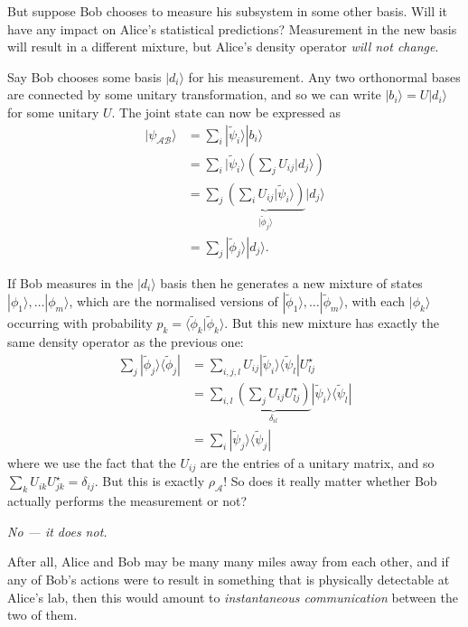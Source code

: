 \documentclass[fleqn]{article}
\renewcommand{\footnote}[1]{\en{#1}}
\begin{document}
But suppose Bob chooses to measure his subsystem in some other basis.
Will it have any impact on Alice's statistical predictions?
Measurement in the new basis will result in a different mixture, but Alice's density operator \emph{will not change}.

Say Bob chooses some basis \(|d_i\rangle\) for his measurement.
Any two orthonormal bases are connected by some unitary transformation, and so we can write \(|b_i\rangle=U|d_i\rangle\) for some\footnote{In terms of components, \(|b_i\rangle=\sum_j U_{ij}|d_j\rangle\)} unitary \(U\).
The joint state can now be expressed as
\[
  \begin{aligned}
    |\psi_{\mathcal{AB}}\rangle
    &= \sum_{i} |\widetilde\psi_i\rangle|b_i\rangle
  \\&= \sum_{i} |\widetilde\psi_i\rangle \left( \sum_j U_{ij}|d_j\rangle \right)
  \\&= \sum_j \underbrace{\left( \sum_i U_{ij}|\widetilde\psi_i\rangle \right)}_{|\widetilde\phi_j\rangle}|d_j\rangle
  \\&= \sum_j|\widetilde\phi_j\rangle|d_j\rangle.
  \end{aligned}
\]

If Bob measures in the \(|d_i\rangle\) basis then he generates a new mixture of states \(|\phi_1\rangle,\ldots|\phi_m\rangle\), which are the normalised versions of \(|\widetilde\phi_1\rangle,\ldots|\widetilde\phi_m\rangle\), with each \(|\phi_k\rangle\) occurring with probability \(p_k=\langle\widetilde\phi_k|\widetilde\phi_k\rangle\).
But this new mixture has exactly the same density operator as the previous one:
\[
  \begin{aligned}
    \sum_j|\widetilde\phi_j\rangle\langle\widetilde\phi_j|
    &= \sum_{i,j,l} U_{ij}|\widetilde\psi_i\rangle\langle\widetilde\psi_l|U^\star_{lj}
  \\&= \sum_{i,l} \underbrace{\left(\sum_j U_{ij}U^\star_{lj}\right)}_{\delta_{il}}|\widetilde\psi_i\rangle\langle\widetilde\psi_l|
  \\&= \sum_i|\widetilde\psi_j\rangle\langle\widetilde\psi_j|
  \end{aligned}
\]
where we use the fact that the \(U_{ij}\) are the entries of a unitary matrix, and so \(\sum_k U_{ik}U^\star_{jk}=\delta_{ij}\).
But this is exactly \(\rho_{\mathcal{A}}\)!
So does it really matter whether Bob actually performs the measurement or not?

\emph{No --- it does not.}

After all, Alice and Bob may be many many miles away from each other, and if any of Bob's actions were to result in something that is physically detectable at Alice's lab, then this would amount to \emph{instantaneous communication} between the two of them.
\end{document}
